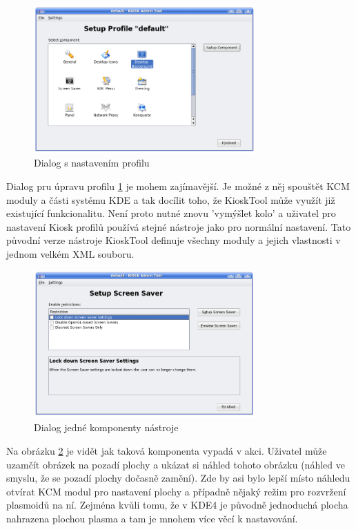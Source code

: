 \begin{figure}[h]
    \centering
    \includegraphics[width=8.5cm]{obrazky/KioskToolKDE3/seznam_komponent.png}
    \caption{Dialog s nastavením profilu}
    \label{fig:kt3_nast_prof}
\end{figure}
Dialog pru úpravu profilu \ref{fig:kt3_nast_prof} je mohem zajímavější. Je možné
z něj spouštět KCM moduly a části systému KDE a tak docílit toho, že KioskTool
může využít již existující funkcionalitu. Není proto nutné znovu 'vymýšlet kolo'
a uživatel pro nastavení Kiosk profilů používá stejné nástroje jako pro normální
nastavení. Tato původní verze nástroje KioskTool definuje všechny moduly
a jejich vlastnosti v jednom velkém XML souboru.

\begin{figure}[h]
    \centering
    \includegraphics[width=8.5cm]{obrazky/KioskToolKDE3/ukazka_komponenty.png}
    \caption{Dialog jedné komponenty nástroje}
    \label{fig:kt3_nast_komp}
\end{figure}
Na obrázku \ref{fig:kt3_nast_komp} je vidět jak taková komponenta vypadá
v akci. Uživatel může uzamčít obrázek na pozadí plochy a ukázat si náhled tohoto
obrázku (náhled ve smyslu, že se pozadí plochy dočasně zamění). Zde by asi bylo
lepší místo náhledu otvírat KCM modul pro nastavení plochy a případně nějaký
režim pro rozvržení plasmoidů  na ní. Zejména kvůli tomu, že v KDE4 je původně %
jednoduchá plocha nahrazena plochou plasma a tam je mnohem více věcí
k nastavování.

